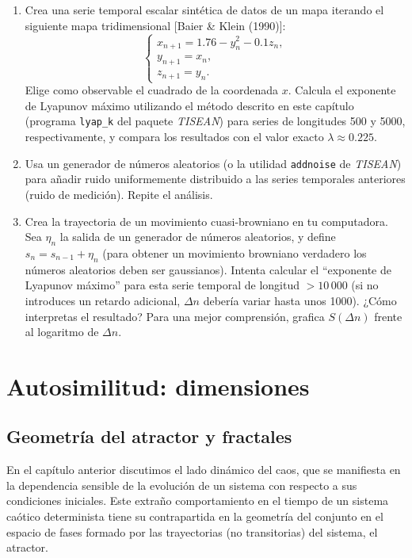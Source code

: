 \documentclass[10pt,a4paper]{book}
\begin{document}
\begin{enumerate}
    \item Crea una serie temporal escalar sintética de datos de un mapa iterando el siguiente mapa tridimensional [Baier \& Klein (1990)]:
    \[
    \begin{cases}
        x_{n+1} = 1.76 - y_n^2 - 0.1z_n, \\
        y_{n+1} = x_n, \\
        z_{n+1} = y_n.
    \end{cases}
    \]
    Elige como observable el cuadrado de la coordenada \(x\). Calcula el exponente de Lyapunov máximo utilizando el método descrito en este capítulo (programa \texttt{lyap\_k} del paquete \textit{TISEAN}) para series de longitudes 500 y 5000, respectivamente, y compara los resultados con el valor exacto \(\lambda \approx 0.225\).
	\newpage
    \item Usa un generador de números aleatorios (o la utilidad \texttt{addnoise} de \textit{TISEAN}) para añadir ruido uniformemente distribuido a las series temporales anteriores (ruido de medición). Repite el análisis.
	\newpage
    \item Crea la trayectoria de un movimiento cuasi-browniano en tu computadora. Sea \(\eta_n\) la salida de un generador de números aleatorios, y define \(s_n = s_{n-1} + \eta_n\) (para obtener un movimiento browniano verdadero los números aleatorios deben ser gaussianos). Intenta calcular el “exponente de Lyapunov máximo” para esta serie temporal de longitud \(> 10\,000\) (si no introduces un retardo adicional, \(\Delta n\) debería variar hasta unos 1000). ¿Cómo interpretas el resultado? Para una mejor comprensión, grafica \(S(\Delta n)\) frente al logaritmo de \(\Delta n\).
\end{enumerate}


\chapter{Autosimilitud: dimensiones}
\section{Geometría del atractor y fractales}

En el capítulo anterior discutimos el lado dinámico del caos, que se manifiesta en la dependencia sensible de la evolución de un sistema con respecto a sus condiciones iniciales. Este extraño comportamiento en el tiempo de un sistema caótico determinista tiene su contrapartida en la geometría del conjunto en el espacio de fases formado por las trayectorias (no transitorias) del sistema, el atractor.
\end{document}
